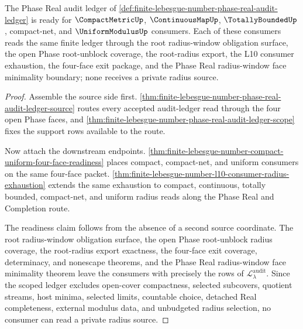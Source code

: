 \begin{theorem}
\label{thm:finite-lebesgue-number-phase-real-audit-ledger-readiness}
The Phase Real audit ledger of \autoref{def:finite-lebesgue-number-phase-real-audit-ledger} is ready for $\CompactMetricUp$, $\ContinuousMapUp$, $\TotallyBoundedUp$, compact-net, and $\UniformModulusUp$ consumers. Each of these consumers reads the same finite ledger through the root radius-window obligation surface, the open Phase root-unblock coverage, the root-radius export, the L10 consumer exhaustion, the four-face exit package, and the Phase Real radius-window face minimality boundary; none receives a private radius source.
\end{theorem}
\begin{proof}
Assemble the source side first. \autoref{thm:finite-lebesgue-number-phase-real-audit-ledger-source} routes every accepted audit-ledger read through the four open Phase faces, and \autoref{thm:finite-lebesgue-number-phase-real-audit-ledger-scope} fixes the support rows available to the route.

Now attach the downstream endpoints. \autoref{thm:finite-lebesgue-number-compact-uniform-four-face-readiness} places compact, compact-net, and uniform consumers on the same four-face packet. \autoref{thm:finite-lebesgue-number-l10-consumer-radius-exhaustion} extends the same exhaustion to compact, continuous, totally bounded, compact-net, and uniform radius reads along the Phase Real and Completion route.

The readiness claim follows from the absence of a second source coordinate. The root radius-window obligation surface, the open Phase root-unblock radius coverage, the root-radius export exactness, the four-face exit coverage, determinacy, and nonescape theorems, and the Phase Real radius-window face minimality theorem leave the consumers with precisely the rows of $\mathcal{L}_{\lambda}^{\mathrm{audit}}$. Since the scoped ledger excludes open-cover compactness, selected subcovers, quotient streams, host minima, selected limits, countable choice, detached Real completeness, external modulus data, and unbudgeted radius selection, no consumer can read a private radius source.
\end{proof}
